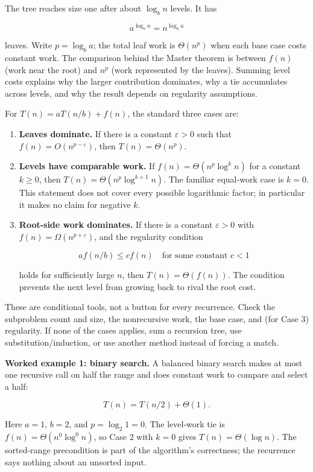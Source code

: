 The tree reaches size one after about \(\log_b n\) levels. It has

\[
a^{\log_b n}=n^{\log_b a}
\]

leaves. Write \(p=\log_b a\); the total leaf work is \(\Theta(n^p)\) when each base case costs constant work. The comparison behind the Master theorem is between \(f(n)\) (work near the root) and \(n^p\) (work represented by the leaves). Summing level costs explains why the larger contribution dominates, why a tie accumulates across levels, and why the result depends on regularity assumptions.

For \(T(n)=aT(n/b)+f(n)\), the standard three cases are:

\begin{enumerate}
\def\labelenumi{\arabic{enumi}.}
\item
  \textbf{Leaves dominate.} If there is a constant \(\varepsilon>0\) such that \(f(n)=O(n^{p-\varepsilon})\), then \(T(n)=\Theta(n^p)\).
\item
  \textbf{Levels have comparable work.} If \(f(n)=\Theta(n^p\log^k n)\) for a constant \(k\geq0\), then \(T(n)=\Theta(n^p\log^{k+1}n)\). The familiar equal-work case is \(k=0\). This statement does not cover every possible logarithmic factor; in particular it makes no claim for negative \(k\).
\item
  \textbf{Root-side work dominates.} If there is a constant \(\varepsilon>0\) with \(f(n)=\Omega(n^{p+\varepsilon})\), and the regularity condition

  \[
  a f(n/b)\leq c f(n)\quad\text{for some constant }c<1
  \]

  holds for sufficiently large \(n\), then \(T(n)=\Theta(f(n))\). The condition prevents the next level from growing back to rival the root cost.
\end{enumerate}

These are conditional tools, not a button for every recurrence. Check the subproblem count and size, the nonrecursive work, the base case, and (for Case 3) regularity. If none of the cases applies, sum a recursion tree, use substitution/induction, or use another method instead of forcing a match.

\textbf{Worked example 1: binary search.} A balanced binary search makes at most one recursive call on half the range and does constant work to compare and select a half:

\[
T(n)=T(n/2)+\Theta(1).
\]

Here \(a=1\), \(b=2\), and \(p=\log_2 1=0\). The level-work tie is \(f(n)=\Theta(n^0\log^0 n)\), so Case 2 with \(k=0\) gives \(T(n)=\Theta(\log n)\). The sorted-range precondition is part of the algorithm's correctness; the recurrence says nothing about an unsorted input.


